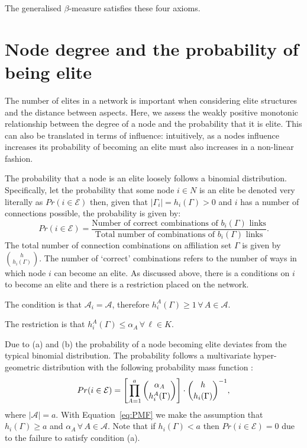 \begin{subappendices}
The generalised $\beta$-measure satisfies these four axioms.

\section[Degree and probabilistic eliteness]{Node degree and the probability of being elite} \label{AppA}

The number of elites in a network is important when considering elite structures and the distance between aspects. Here, we assess the weakly positive monotonic relationship between the degree of a node and the probability that it is elite. This can also be translated in terms of influence: intuitively, as a nodes influence increases its probability of becoming an elite must also increases in a non-linear fashion.

The probability that a node is an elite loosely follows a binomial distribution. Specifically, let the probability that some node $i \in N$ is an elite be denoted very literally as $Pr(i \in \mathcal{E})$ then, given that $| \Gamma_{i} | = h_{i}(\Gamma) > 0$ and $i$ has a number of connections possible, the probability is given by:
\[
Pr(i \in \mathcal{E}) = \frac{\mbox{Number of correct combinations of $b_{i}(\Gamma)$ links}}{\mbox{Total number of combinations of $b_{i}(\Gamma)$ links}}.
\]
The total number of connection combinations on affiliation set $\Gamma$ is given by $\binom{h}{h_{i}(\Gamma)}$. The number of `correct' combinations refers to the number of ways in which node $i$ can become an elite. As discussed above, there is a conditions on $i$ to become an elite and there is a restriction placed on the network.

\begin{abet}
\item The condition is that $\mathcal{A}_{i} = \mathcal{A}$, therefore $h^{A}_{i}(\Gamma) \geqslant 1 \, \forall \, A \in \mathcal{A}$.

\item The restriction is that $h^{A}_{i}(\Gamma) \leqslant \alpha_{A} \, \forall \, \ell \in K$.
\end{abet}
Due to (a) and (b) the probability of a node becoming elite deviates from the typical binomial distribution. The probability follows a multivariate hyper-geometric distribution with the following probability mass function :
\begin{equation} \label{eq:PMF}
Pr(i \in \mathcal{E}) =  \left[ \prod_{A = 1}^{a} \dbinom{\alpha_{A}}{h^{A}_{i}(\Gamma)} \right] \cdot \dbinom{h}{h_{i}(\Gamma)}^{-1},
\end{equation}
where $| \mathcal{A} | = a$. With Equation~\ref{eq:PMF} we make the assumption that $h_{i}(\Gamma) \geqslant a$ and $\alpha_{A} \, \forall \, A \in \mathcal{A}$. Note that if $h_{i}(\Gamma) < a$ then $Pr(i \in \mathcal{E}) = 0$ due to the failure to satisfy condition (a).


\end{subappendices}
